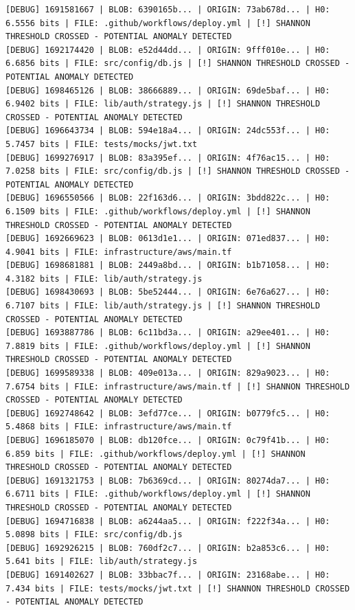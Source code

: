 \documentclass[12pt, a4paper, oneside]{report}
\begin{document}
\begin{lstlisting}[basicstyle=\tiny\ttfamily]
[DEBUG] 1691581667 | BLOB: 6390165b... | ORIGIN: 73ab678d... | H0: 6.5556 bits | FILE: .github/workflows/deploy.yml | [!] SHANNON THRESHOLD CROSSED - POTENTIAL ANOMALY DETECTED
[DEBUG] 1692174420 | BLOB: e52d44dd... | ORIGIN: 9fff010e... | H0: 6.6856 bits | FILE: src/config/db.js | [!] SHANNON THRESHOLD CROSSED - POTENTIAL ANOMALY DETECTED
[DEBUG] 1698465126 | BLOB: 38666889... | ORIGIN: 69de5baf... | H0: 6.9402 bits | FILE: lib/auth/strategy.js | [!] SHANNON THRESHOLD CROSSED - POTENTIAL ANOMALY DETECTED
[DEBUG] 1696643734 | BLOB: 594e18a4... | ORIGIN: 24dc553f... | H0: 5.7457 bits | FILE: tests/mocks/jwt.txt
[DEBUG] 1699276917 | BLOB: 83a395ef... | ORIGIN: 4f76ac15... | H0: 7.0258 bits | FILE: src/config/db.js | [!] SHANNON THRESHOLD CROSSED - POTENTIAL ANOMALY DETECTED
[DEBUG] 1696550566 | BLOB: 22f163d6... | ORIGIN: 3bdd822c... | H0: 6.1509 bits | FILE: .github/workflows/deploy.yml | [!] SHANNON THRESHOLD CROSSED - POTENTIAL ANOMALY DETECTED
[DEBUG] 1692669623 | BLOB: 0613d1e1... | ORIGIN: 071ed837... | H0: 4.9041 bits | FILE: infrastructure/aws/main.tf
[DEBUG] 1698681881 | BLOB: 2449a8bd... | ORIGIN: b1b71058... | H0: 4.3182 bits | FILE: lib/auth/strategy.js
[DEBUG] 1698430693 | BLOB: 5be52444... | ORIGIN: 6e76a627... | H0: 6.7107 bits | FILE: lib/auth/strategy.js | [!] SHANNON THRESHOLD CROSSED - POTENTIAL ANOMALY DETECTED
[DEBUG] 1693887786 | BLOB: 6c11bd3a... | ORIGIN: a29ee401... | H0: 7.8819 bits | FILE: .github/workflows/deploy.yml | [!] SHANNON THRESHOLD CROSSED - POTENTIAL ANOMALY DETECTED
[DEBUG] 1699589338 | BLOB: 409e013a... | ORIGIN: 829a9023... | H0: 7.6754 bits | FILE: infrastructure/aws/main.tf | [!] SHANNON THRESHOLD CROSSED - POTENTIAL ANOMALY DETECTED
[DEBUG] 1692748642 | BLOB: 3efd77ce... | ORIGIN: b0779fc5... | H0: 5.4868 bits | FILE: infrastructure/aws/main.tf
[DEBUG] 1696185070 | BLOB: db120fce... | ORIGIN: 0c79f41b... | H0: 6.859 bits | FILE: .github/workflows/deploy.yml | [!] SHANNON THRESHOLD CROSSED - POTENTIAL ANOMALY DETECTED
[DEBUG] 1691321753 | BLOB: 7b6369cd... | ORIGIN: 80274da7... | H0: 6.6711 bits | FILE: .github/workflows/deploy.yml | [!] SHANNON THRESHOLD CROSSED - POTENTIAL ANOMALY DETECTED
[DEBUG] 1694716838 | BLOB: a6244aa5... | ORIGIN: f222f34a... | H0: 5.0898 bits | FILE: src/config/db.js
[DEBUG] 1692926215 | BLOB: 760df2c7... | ORIGIN: b2a853c6... | H0: 5.641 bits | FILE: lib/auth/strategy.js
[DEBUG] 1691402627 | BLOB: 33bbac7f... | ORIGIN: 23168abe... | H0: 7.434 bits | FILE: tests/mocks/jwt.txt | [!] SHANNON THRESHOLD CROSSED - POTENTIAL ANOMALY DETECTED

\end{lstlisting}
\end{document}
